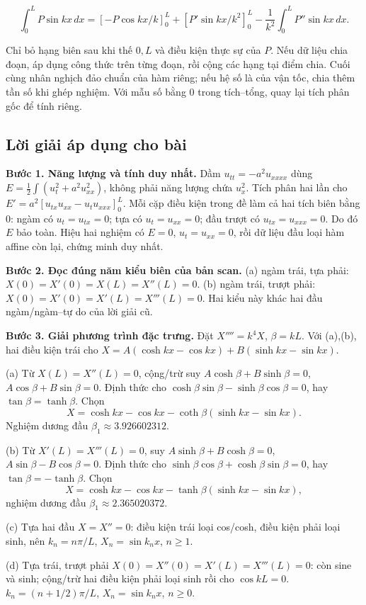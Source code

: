 \documentclass[10pt,a4paper]{article}
\begin{document}
\[
\int_0^L P\sin kx\,dx
=\left[-P\cos kx/k\right]_0^L+
\left[P'\sin kx/k^2\right]_0^L-
\frac1{k^2}\int_0^L P''\sin kx\,dx.
\]


Chỉ bỏ hạng biên sau khi thế $0,L$ và điều kiện thực sự của $P$. Nếu dữ liệu chia đoạn, áp dụng công thức trên từng đoạn, rồi cộng các hạng tại điểm chia. Cuối cùng nhân nghịch đảo chuẩn của hàm riêng; nếu hệ số là của vận tốc, chia thêm tần số khi ghép nghiệm. Với mẫu số bằng $0$ trong tích–tổng, quay lại tích phân gốc để tính riêng.
\subsection*{Lời giải áp dụng cho bài}
\textbf{Bước 1. Năng lượng và tính duy nhất.} Dầm $u_{tt}=-a^2u_{xxxx}$ dùng $E=\frac12\int(u_t^2+a^2u_{xx}^2)$, không phải năng lượng chứa $u_x^2$. Tích phân hai lần cho $E'=a^2[u_{tx}u_{xx}-u_tu_{xxx}]_0^L$. Mỗi cặp điều kiện trong đề làm cả hai tích biên bằng $0$: ngàm có $u_t=u_{tx}=0$; tựa có $u_t=u_{xx}=0$; đầu trượt có $u_{tx}=u_{xxx}=0$. Do đó $E$ bảo toàn. Hiệu hai nghiệm có $E=0$, $u_t=u_{xx}=0$, rồi dữ liệu đầu loại hàm affine còn lại, chứng minh duy nhất.

\textbf{Bước 2. Đọc đúng năm kiểu biên của bản scan.} (a) ngàm trái, tựa phải: $X(0)=X'(0)=X(L)=X''(L)=0$. (b) ngàm trái, trượt phải: $X(0)=X'(0)=X'(L)=X'''(L)=0$. Hai kiểu này khác hai đầu ngàm/ngàm–tự do của lời giải cũ.

\textbf{Bước 3. Giải phương trình đặc trưng.} Đặt $X''''=k^4X$, $\beta=kL$. Với (a),(b), hai điều kiện trái cho $X=A(\cosh kx-\cos kx)+B(\sinh kx-\sin kx)$.

(a) Từ $X(L)=X''(L)=0$, cộng/trừ suy $A\cosh\beta+B\sinh\beta=0$, $A\cos\beta+B\sin\beta=0$. Định thức cho $\cosh\beta\sin\beta-\sinh\beta\cos\beta=0$, hay $\tan\beta=\tanh\beta$. Chọn
\[X=\cosh kx-\cos kx-\coth\beta(\sinh kx-\sin kx).\]
Nghiệm dương đầu $\beta_1\approx3.926602312$.

(b) Từ $X'(L)=X'''(L)=0$, suy $A\sinh\beta+B\cosh\beta=0$, $A\sin\beta-B\cos\beta=0$. Định thức cho $\sinh\beta\cos\beta+\cosh\beta\sin\beta=0$, hay $\tan\beta=-\tanh\beta$. Chọn
\[X=\cosh kx-\cos kx-\tanh\beta(\sinh kx-\sin kx),\]
nghiệm dương đầu $\beta_1\approx2.365020372$.

(c) Tựa hai đầu $X=X''=0$: điều kiện trái loại cos/cosh, điều kiện phải loại sinh, nên $k_n=n\pi/L$, $X_n=\sin k_nx$, $n\ge1$.

(d) Tựa trái, trượt phải $X(0)=X''(0)=X'(L)=X'''(L)=0$: còn sine và sinh; cộng/trừ hai điều kiện phải loại sinh rồi cho $\cos kL=0$. $k_n=(n+1/2)\pi/L$, $X_n=\sin k_nx$, $n\ge0$.
\end{document}
